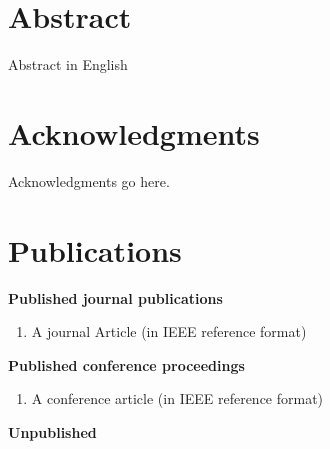 \documentclass[a4paper,12pt,openright]{book}
\begin{document}




\coverpage
\copyrightpage
\approvalpage

\onehalfspace
\chapter*{Abstract}
Abstract in English



\chapter*{Acknowledgments}
Acknowledgments go here.


\chapter*{Publications}

\begin{center}
\textbf{Published journal publications}
\end{center}
\begin{enumerate}
\item A journal Article (in IEEE reference format)
\end{enumerate}

\begin{center}
\textbf{Published conference proceedings}
\end{center}

\begin{enumerate}
\item A conference article (in IEEE reference format)
\end{enumerate}

\begin{center}
\textbf{Unpublished}
\end{center}


\tableofcontents

\vspace{1in}

\printnomenclature
\listoffigures
\listoftables

%



\singlespace


%
\end{document}
